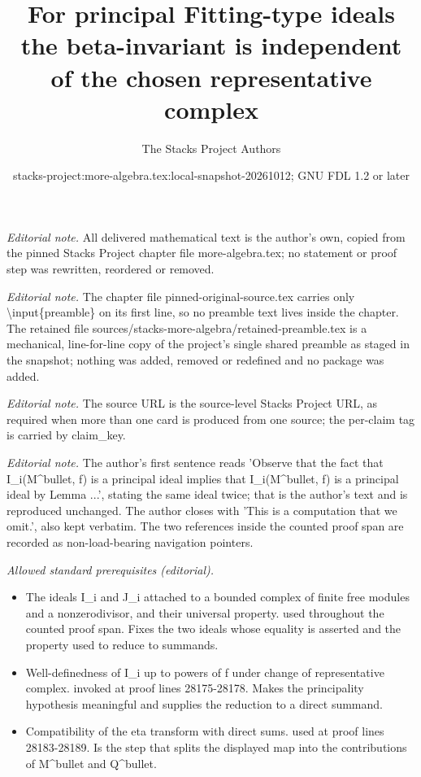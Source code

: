 \documentclass[10pt,a4paper]{amsart}
\title{For principal Fitting-type ideals the beta-invariant is independent of the chosen representative complex}
\author{The Stacks Project Authors}
\date{stacks-project:more-algebra.tex:local-snapshot-20261012; GNU FDL 1.2 or later}
\theoremstyle{plain}
\theoremstyle{definition}
\theoremstyle{remark}
\numberwithin{equation}{subsection}
\begin{document}
\maketitle
\setcounter{subsection}{1}
\noindent\textit{Editorial note.} All delivered mathematical text is the author's own, copied from the pinned Stacks Project chapter file more-algebra.tex; no statement or proof step was rewritten, reordered or removed.\par\medskip
\noindent\textit{Editorial note.} The chapter file pinned-original-source.tex carries only \textbackslash{}input\{preamble\} on its first line, so no preamble text lives inside the chapter. The retained file sources/stacks-more-algebra/retained-preamble.tex is a mechanical, line-for-line copy of the project's single shared preamble as staged in the snapshot; nothing was added, removed or redefined and no package was added.\par\medskip
\noindent\textit{Editorial note.} The source URL is the source-level Stacks Project URL, as required when more than one card is produced from one source; the per-claim tag is carried by claim\_key.\par\medskip
\noindent\textit{Editorial note.} The author's first sentence reads 'Observe that the fact that I\_i(M\textasciicircum{}bullet, f) is a principal ideal implies that I\_i(M\textasciicircum{}bullet, f) is a principal ideal by Lemma ...', stating the same ideal twice; that is the author's text and is reproduced unchanged. The author closes with 'This is a computation that we omit.', also kept verbatim. The two references inside the counted proof span are recorded as non-load-bearing navigation pointers.\par\medskip
\noindent\textit{Allowed standard prerequisites (editorial).}\begin{itemize}
\item The ideals I\_i and J\_i attached to a bounded complex of finite free modules and a nonzerodivisor, and their universal property. used throughout the counted proof span. Fixes the two ideals whose equality is asserted and the property used to reduce to summands.
\item Well-definedness of I\_i up to powers of f under change of representative complex. invoked at proof lines 28175-28178. Makes the principality hypothesis meaningful and supplies the reduction to a direct summand.
\item Compatibility of the eta transform with direct sums. used at proof lines 28183-28189. Is the step that splits the displayed map into the contributions of M\textasciicircum{}bullet and Q\textasciicircum{}bullet.
\end{itemize}\medskip
\end{document}
